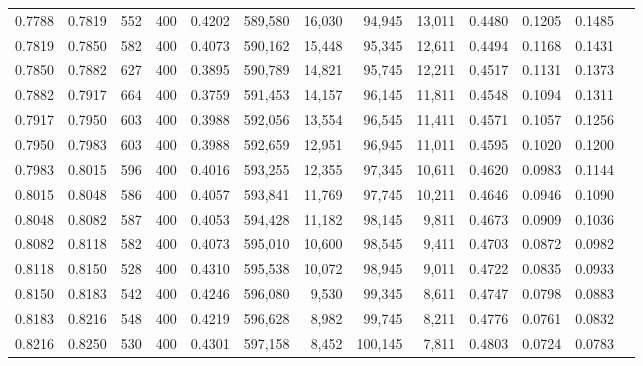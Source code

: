 \begin{tabular}{rrrrrrrrrrrrr}
0.7788 & 0.7819 &    552 & 400 &                                     0.4202 & 589,580 &  16,030 &  94,945 &  13,011 & 0.4480 & 0.1205 & 0.1485 \\
0.7819 & 0.7850 &    582 & 400 &                                     0.4073 & 590,162 &  15,448 &  95,345 &  12,611 & 0.4494 & 0.1168 & 0.1431 \\
0.7850 & 0.7882 &    627 & 400 &                                     0.3895 & 590,789 &  14,821 &  95,745 &  12,211 & 0.4517 & 0.1131 & 0.1373 \\
0.7882 & 0.7917 &    664 & 400 &                                     0.3759 & 591,453 &  14,157 &  96,145 &  11,811 & 0.4548 & 0.1094 & 0.1311 \\
0.7917 & 0.7950 &    603 & 400 &                                     0.3988 & 592,056 &  13,554 &  96,545 &  11,411 & 0.4571 & 0.1057 & 0.1256 \\
0.7950 & 0.7983 &    603 & 400 &                                     0.3988 & 592,659 &  12,951 &  96,945 &  11,011 & 0.4595 & 0.1020 & 0.1200 \\
0.7983 & 0.8015 &    596 & 400 &                                     0.4016 & 593,255 &  12,355 &  97,345 &  10,611 & 0.4620 & 0.0983 & 0.1144 \\
0.8015 & 0.8048 &    586 & 400 &                                     0.4057 & 593,841 &  11,769 &  97,745 &  10,211 & 0.4646 & 0.0946 & 0.1090 \\
0.8048 & 0.8082 &    587 & 400 &                                     0.4053 & 594,428 &  11,182 &  98,145 &   9,811 & 0.4673 & 0.0909 & 0.1036 \\
0.8082 & 0.8118 &    582 & 400 &                                     0.4073 & 595,010 &  10,600 &  98,545 &   9,411 & 0.4703 & 0.0872 & 0.0982 \\
0.8118 & 0.8150 &    528 & 400 &                                     0.4310 & 595,538 &  10,072 &  98,945 &   9,011 & 0.4722 & 0.0835 & 0.0933 \\
0.8150 & 0.8183 &    542 & 400 &                                     0.4246 & 596,080 &   9,530 &  99,345 &   8,611 & 0.4747 & 0.0798 & 0.0883 \\
0.8183 & 0.8216 &    548 & 400 &                                     0.4219 & 596,628 &   8,982 &  99,745 &   8,211 & 0.4776 & 0.0761 & 0.0832 \\
0.8216 & 0.8250 &    530 & 400 &                                     0.4301 & 597,158 &   8,452 & 100,145 &   7,811 & 0.4803 & 0.0724 & 0.0783 \\

\end{tabular}

